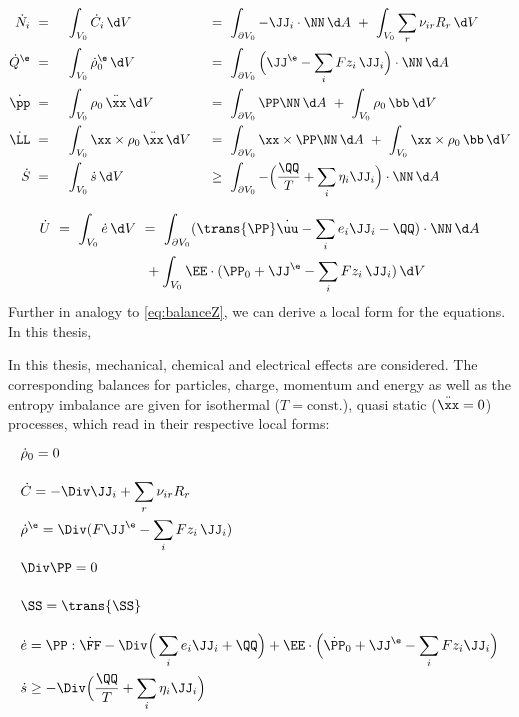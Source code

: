\begin{alignat}{3}
  \dot N_i  & \ = \ && \intVO \dot C_i \dV                            && \ = \ \intdVO -\JJ_i \cdot \NN\dA \ + \   \intVO \sum_r \nu_{ir } R_r \dV \\
  \dot Q^\e & \ = \ && \intVO \dot \rho^\e_0 \dV                      && \ = \ \intdVO \Big(\JJ^\e-\sum_i Fz_i\,\JJ_i\Big) \cdot \NN\dA\\
  \dot \pp  & \ = \ && \intVO \rho_0 \,\ddot\xx \dV  && \ = \ \intdVO \PP\NN \dA \ + \ \intVO \rho_0\,\bb \dV\\
  \dot \LL  & \ = \ && \intVO \xx \times \rho_0 \,\ddot\xx \dV        && \ = \ \intdVO \xx \times \PP\NN \dA \ + \ \intVO \xx \times \rho_0\,\bb \dV\\
  \dot S    & \ = \ && \intVO \dot s \dV                              && \ \geq \ \intdVO -\Big(\frac{\QQ}{T} + \sum_i \eta_i\JJ_i\Big) \cdot \NN \dA 
\end{alignat}

\begin{align}
  \begin{aligned}
  \dot U \ = \ \intVO \dot e \dV \ &= \ \intdVO (\trans{\PP}\dot\uu-\sum_i e_i \JJ_i-\QQ) \cdot \NN \dA \\
          & \ + \intVO \EE\cdot(\PP_0+\JJ^\e-\sum_i Fz_i\,\JJ_i) \dV \\
  \end{aligned}
\end{align}
Further in analogy to \cref{eq:balanceZ}, we can derive a local form for the equations. In this thesis, 

In this thesis, mechanical, chemical and electrical effects are considered. The corresponding balances for particles, charge, momentum and energy as well as the entropy imbalance are given for isothermal ($T=\text{const.}$), quasi static ($\ddot \xx=0$) processes, which read in their respective local forms: 
\begin{align}
  & \vphantom{\sum_i} \dot\rho_0 = 0 \\
  & \vphantom{\sum_i} \dot C = -\Div\JJ_i + \sum_r \nu_{ir} R_{r}  \\
  & \vphantom{\sum_i} \dot \rho^{\e} = \Div(F\JJ^\e - \sum_i Fz_i\, \JJ_i) \\
  & \vphantom{\sum_i} \Div\PP = 0  \\
  & \vphantom{\sum_i} \SS = \trans{\SS} \\
  & \vphantom{\sum_i} \dot e = \PP:\dot\FF - \Div\Big(\sum_i e_i \JJ_i+ \QQ \Big)+ \EE\cdot\Big(\dot \PP_0+\JJ^\e-\sum_i Fz_i\JJ_i\Big) \\
  & \vphantom{\sum_i} \dot s \geq -\Div\Big(\frac{\QQ}{T}+\sum_i \eta_i \JJ_i \Big)
\end{align}

